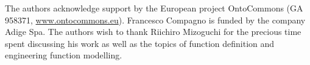 \documentclass[sw]{iosart2x}
\begin{document}
The authors acknowledge support by the European project OntoCommons (GA 958371, \url{www.ontocommons.eu}). Francesco Compagno is funded by the company Adige Spa. 
The authors wish to thank Riichiro Mizoguchi for the precious time spent discussing his work as well as the topics of function definition and engineering function modelling.






%
\end{document}

